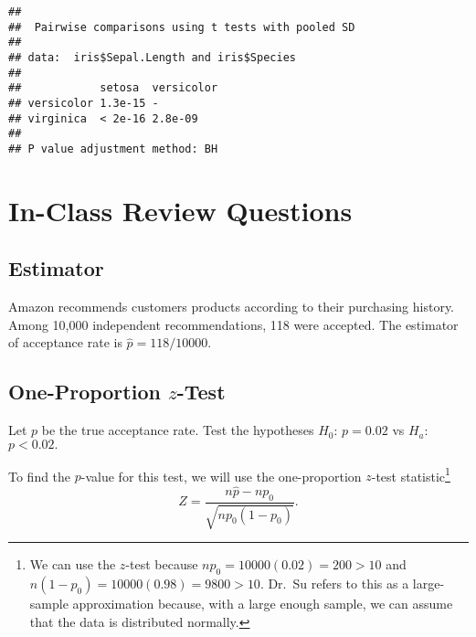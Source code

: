 \documentclass[
]{book}
\newenvironment{Shaded}{\begin{snugshade}}{\end{snugshade}}
\newcommand{\DataTypeTok}[1]{\textcolor[rgb]{0.13,0.29,0.53}{#1}}
\newcommand{\KeywordTok}[1]{\textcolor[rgb]{0.13,0.29,0.53}{\textbf{#1}}}
\newcommand{\NormalTok}[1]{#1}
\newcommand{\OperatorTok}[1]{\textcolor[rgb]{0.81,0.36,0.00}{\textbf{#1}}}
\newcommand{\StringTok}[1]{\textcolor[rgb]{0.31,0.60,0.02}{#1}}
\begin{document}
\begin{Shaded}
\end{Shaded}

\begin{verbatim}
## 
##  Pairwise comparisons using t tests with pooled SD 
## 
## data:  iris$Sepal.Length and iris$Species 
## 
##            setosa  versicolor
## versicolor 1.3e-15 -         
## virginica  < 2e-16 2.8e-09   
## 
## P value adjustment method: BH
\end{verbatim}

\hypertarget{in-class-review-questions}{%
\chapter{In-Class Review Questions}\label{in-class-review-questions}}

\hypertarget{estimator}{%
\section{Estimator}\label{estimator}}

Amazon recommends customers products according to their purchasing history.
Among 10,000 independent recommendations, 118 were accepted.
The estimator of acceptance rate is \(\hat{p} = 118/10000\).

\hypertarget{one-proportion-z-test}{%
\section{\texorpdfstring{One-Proportion \(z\)-Test}{One-Proportion z-Test}}\label{one-proportion-z-test}}

Let \(p\) be the true acceptance rate.
Test the hypotheses
\(H_0\): \(p = 0.02\) vs \(H_a\): \(p < 0.02.\)

To find the \(p\)-value for this test,
we will use the one-proportion \(z\)-test
statistic\footnote{We can use the \(z\)-test because \(np_0 = 10000(0.02) = 200 > 10\)
  and \(n(1 - p_0) = 10000(0.98) = 9800 > 10\).
  Dr.~Su refers to this as a large-sample approximation because, with a large enough sample,
  we can assume that the data is distributed normally.}
\[Z = \frac{n\hat{p} - np_0}{\sqrt{np_0(1 - p_0)}}.\]
\end{document}
